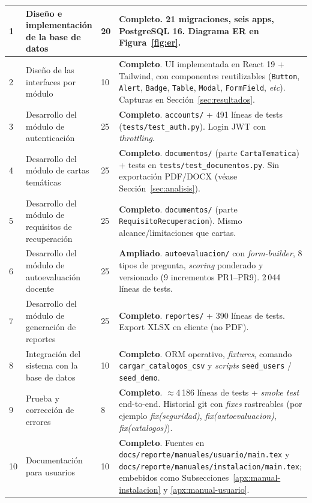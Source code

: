 \begin{longtable}{p{} p{} p{} p{}}
    1 & Diseño e implementación de la base de datos & 20 & \textbf{Completo}. 21 migraciones, seis apps, PostgreSQL 16. Diagrama ER en Figura~\ref{fig:er}. \\
    \midrule
    2 & Diseño de las interfaces por módulo & 10 & \textbf{Completo}. UI implementada en React 19 + Tailwind, con componentes reutilizables (\texttt{Button}, \texttt{Alert}, \texttt{Badge}, \texttt{Table}, \texttt{Modal}, \texttt{FormField}, \emph{etc}). Capturas en Sección~\ref{sec:resultados}. \\
    \midrule
    3 & Desarrollo del módulo de autenticación & 25 & \textbf{Completo}. \texttt{accounts/} + 491 líneas de tests (\texttt{tests/test\_auth.py}). Login JWT con \emph{throttling}. \\
    \midrule
    4 & Desarrollo del módulo de cartas temáticas & 25 & \textbf{Completo}. \texttt{documentos/} (parte \texttt{CartaTematica}) + tests en \texttt{tests/test\_documentos.py}. Sin exportación PDF/DOCX (véase Sección~\ref{sec:analisis}). \\
    \midrule
    5 & Desarrollo del módulo de requisitos de recuperación & 25 & \textbf{Completo}. \texttt{documentos/} (parte \texttt{RequisitoRecuperacion}). Mismo alcance/limitaciones que cartas. \\
    \midrule
    6 & Desarrollo del módulo de autoevaluación docente & 25 & \textbf{Ampliado}. \texttt{autoevaluacion/} con \emph{form-builder}, 8 tipos de pregunta, \emph{scoring} ponderado y versionado (9 incrementos PR1--PR9). 2\,044 líneas de tests. \\
    \midrule
    7 & Desarrollo del módulo de generación de reportes & 25 & \textbf{Completo}. \texttt{reportes/} + 390 líneas de tests. Export XLSX en cliente (no PDF). \\
    \midrule
    8 & Integración del sistema con la base de datos & 10 & \textbf{Completo}. ORM operativo, \emph{fixtures}, comando \texttt{cargar\_catalogos\_csv} y \emph{scripts} \texttt{seed\_users} / \texttt{seed\_demo}. \\
    \midrule
    9 & Prueba y corrección de errores & 8 & \textbf{Completo}. $\approx$4\,186 líneas de tests + \emph{smoke test} end-to-end. Historial git con \emph{fixes} rastreables (por ejemplo \emph{fix(seguridad)}, \emph{fix(autoevaluacion)}, \emph{fix(catalogos)}). \\
    \midrule
    10 & Documentación para usuarios & 10 & \textbf{Completo}. Fuentes en \texttt{docs/reporte/manuales/usuario/main.tex} y \texttt{docs/reporte/manuales/instalacion/main.tex}; embebidos como Subsecciones~\ref{apx:manual-instalacion} y \ref{apx:manual-usuario}. \\

\end{longtable}
